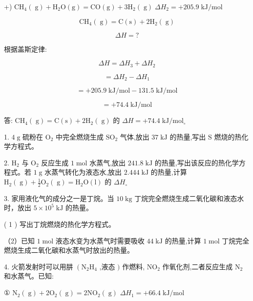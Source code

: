 \documentclass[10pt]{article}
\begin{document}
+) \({\mathrm{{CH}}}_{4}\left( \mathrm{\;g}\right) + {\mathrm{H}}_{2}\mathrm{O}\left( \mathrm{g}\right) = \mathrm{{CO}}\left( \mathrm{g}\right) + 3{\mathrm{H}}_{2}\left( \mathrm{\;g}\right) \;\Delta {H}_{2} = + {205.9}\mathrm{\;{kJ}}/\mathrm{{mol}}\)

\[
{\mathrm{{CH}}}_{4}\left( \mathrm{\;g}\right) = \mathrm{C}\left( \mathrm{s}\right) + 2{\mathrm{H}}_{2}\left( \mathrm{\;g}\right)
\]

\[
{\Delta H} = ?
\]

根据盖斯定律:

\[
{\Delta H} = \Delta {H}_{3} + \Delta {H}_{2}
\]

\[
= \Delta {H}_{2} - \Delta {H}_{1}
\]

\[
= + {205.9}\mathrm{\;{kJ}}/\mathrm{{mol}} - {131.5}\mathrm{\;{kJ}}/\mathrm{{mol}}
\]

\[
= + {74.4}\mathrm{\;{kJ}}/\mathrm{{mol}}
\]

答: \({\mathrm{{CH}}}_{4}\left( \mathrm{\;g}\right) = \mathrm{C}\left( \mathrm{s}\right) + 2{\mathrm{H}}_{2}\left( \mathrm{\;g}\right)\) 的 \({\Delta H} = + {74.4}\mathrm{\;{kJ}}/{\mathrm{{mol}}}_{ \circ }\)

1. \(4\mathrm{\;g}\) 硫粉在 \({\mathrm{O}}_{2}\) 中完全燃烧生成 \({\mathrm{{SO}}}_{2}\) 气体,放出 \({37}\mathrm{\;{kJ}}\) 的热量,写出 \(\mathrm{S}\) 燃烧的热化学方程式。

2. \({\mathrm{H}}_{2}\) 与 \({\mathrm{O}}_{2}\) 反应生成 \(1\mathrm{\;{mol}}\) 水蒸气,放出 \({241.8}\mathrm{\;{kJ}}\) 的热量,写出该反应的热化学方程式。若 \(1\mathrm{\;g}\) 水蒸气转化为液态水,放出 \({2.444}\mathrm{\;{kJ}}\) 的热量,计算 \({\mathrm{H}}_{2}\left( \mathrm{\;g}\right) + \frac{1}{2}{\mathrm{O}}_{2}\left( \mathrm{\;g}\right) = {\mathrm{H}}_{2}\mathrm{O}\left( \mathrm{l}\right)\) 的 \(\Delta {H}_{ \circ }\)

3. 家用液化气的成分之一是丁烷。当 \({10}\mathrm{\;{kg}}\) 丁烷完全燃烧生成二氧化碳和液态水时，放出 \(5 \times {10}^{5}\mathrm{\;{kJ}}\) 的热量。

( 1 ) 写出丁烷燃烧的热化学方程式。

（2）已知 \(1\mathrm{\;{mol}}\) 液态水变为水蒸气时需要吸收 \({44}\mathrm{\;{kJ}}\) 的热量,计算 \(1\mathrm{\;{mol}}\) 丁烷完全燃烧生成二氧化碳和水蒸气时放出的热量。

4. 火箭发射时可以用肼 \(\left( {{\mathrm{N}}_{2}{\mathrm{H}}_{4}}\right.\) ,液态 \()\) 作燃料, \({\mathrm{{NO}}}_{2}\) 作氧化剂,二者反应生成 \({\mathrm{N}}_{2}\) 和水蒸气。已知:

① \({\mathrm{N}}_{2}\left( \mathrm{\;g}\right) + 2{\mathrm{O}}_{2}\left( \mathrm{\;g}\right) = 2{\mathrm{{NO}}}_{2}\left( \mathrm{\;g}\right)\) \(\Delta {H}_{1} = + {66.4}\mathrm{\;{kJ}}/\mathrm{{mol}}\)
\end{document}
